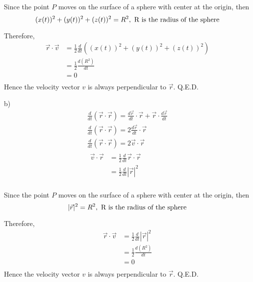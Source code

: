 \documentclass{article}
\begin{document}
Since the point $P$ moves on the surface of a sphere with center at the origin, then
\begin{equation*}
  (x(t))^2 + (y(t))^2 + (z(t))^2 = R^2 ,\ \textnormal{R is the radius of the sphere}
\end{equation*}

Therefore,
\begin{equation*}
  \begin{split}
    \vec{r} \cdot \vec{v} &= \frac{1}{2} \frac{d}{dt} ((x(t))^2 + (y(t))^2 + (z(t))^2) \\
                          &= \frac{1}{2} \frac{d(R^2)}{dt} \\
                          &= 0 \\
  \end{split}
\end{equation*}
Hence the velocity vector $v$ is always perpendicular to $\vec{r}$. Q.E.D.

b)
\begin{gather*}
  \frac{d}{dt} (\vec{r} \cdot \vec{r}) = \frac{d\vec{r}}{dt} \cdot \vec{r} + \vec{r} \cdot \frac{d\vec{r}}{dt} \\
  \frac{d}{dt} (\vec{r} \cdot \vec{r}) = 2 \frac{d\vec{r}}{dt} \cdot \vec{r} \\
  \frac{d}{dt} (\vec{r} \cdot \vec{r}) = 2 \vec{v} \cdot \vec{r} \\
  \begin{split}
    \vec{v} \cdot \vec{r} &= \frac{1}{2} \frac{d}{dt} \vec{r} \cdot \vec{r} \\
                          &= \frac{1}{2} \frac{d}{dt} |\vec{r}|^2 \\
  \end{split}
\end{gather*}

Since the point $P$ moves on the surface of a sphere with center at the origin, then
\begin{equation*}
  |\vec{r}|^2 = R^2 ,\ \textnormal{R is the radius of the sphere}
\end{equation*}

Therefore,
\begin{equation*}
  \begin{split}
    \vec{r} \cdot \vec{v} &= \frac{1}{2} \frac{d}{dt} |\vec{r}|^2 \\
                          &= \frac{1}{2} \frac{d(R^2)}{dt} \\
                          &= 0 \\
  \end{split}
\end{equation*}
Hence the velocity vector $v$ is always perpendicular to $\vec{r}$. Q.E.D.
\end{document}
